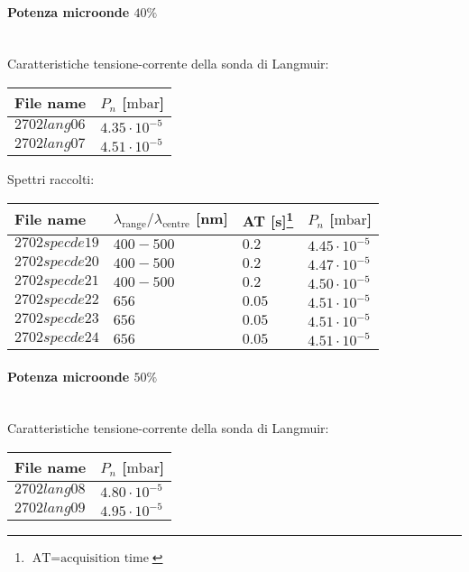 \paragraph*{Potenza microonde $\text{40\%}$} ~\\
Caratteristiche tensione-corrente della sonda di Langmuir:
\begin{center}
\begin{tabular}{p{3cm}p{3cm}}
\toprule
File name	&$P_n$ [$\si{\milli\bar}$]\\
\midrule
$2702lang06$	&$4.35\cdot10^{-5}$\\
$2702lang07$	&$4.51\cdot10^{-5}$\\
\bottomrule
\end{tabular}
\end{center}

Spettri raccolti:
\begin{center}
\begin{tabular}{p{3cm}p{4cm}p{2cm}p{3cm}}
\toprule
File name	&$\lambda_\text{range}\text{/}\lambda_\text{centre}$ [nm] 	&AT [s]\footnote{$\text{AT}=\text{acquisition time}$} &$P_n$ [$\si{\milli\bar}$]\\
\midrule
$2702specde19$	&$400-500$	&$0.2$		&$4.45\cdot10^{-5}$\\
$2702specde20$	&$400-500$	&$0.2$		&$4.47\cdot10^{-5}$\\
$2702specde21$	&$400-500$	&$0.2$		&$4.50\cdot10^{-5}$\\
$2702specde22$	&$656$		&$0.05$		&$4.51\cdot10^{-5}$\\
$2702specde23$	&$656$		&$0.05$		&$4.51\cdot10^{-5}$\\
$2702specde24$	&$656$		&$0.05$		&$4.51\cdot10^{-5}$\\
\bottomrule
\end{tabular}
\end{center}

\paragraph*{Potenza microonde $\text{50\%}$} ~\\
Caratteristiche tensione-corrente della sonda di Langmuir:
\begin{center}
\begin{tabular}{p{3cm}p{3cm}}
\toprule
File name	&$P_n$ [$\si{\milli\bar}$]\\
\midrule
$2702lang08$	&$4.80\cdot10^{-5}$\\
$2702lang09$	&$4.95\cdot10^{-5}$\\
\bottomrule
\end{tabular}
\end{center}

